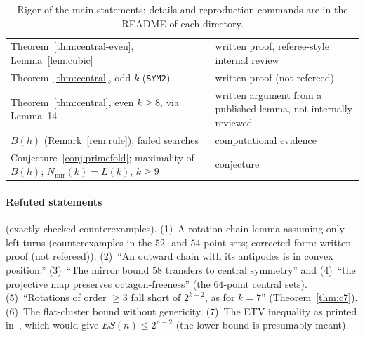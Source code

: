 \documentclass[10pt]{article}
\theoremstyle{definition}
\theoremstyle{remark}
\newcommand{\Nm}{N_{\mathrm{mir}}}
\newcommand{\dirn}[1]{{\upshape\nolinkurl{#1}}}
\begin{document}
\begin{table}[ht]
\begin{tabular}{@{}p{}p{}@{}}
Theorem~\ref{thm:central-even}, Lemma~\ref{lem:cubic} & written proof, referee-style internal review\\
Theorem~\ref{thm:central}, odd $k$ (\dirn{SYM2}) & written proof (not refereed)\\
Theorem~\ref{thm:central}, even $k\ge8$, via Lemma~14 & written argument from a published lemma, not internally reviewed\\
$B(h)$ (Remark~\ref{rem:rule}); failed searches & computational evidence\\
Conjecture~\ref{conj:primefold}; maximality of $B(h)$; $\Nm(k)=L(k)$, $k\ge9$ & conjecture\\
\bottomrule
\end{tabular}
\caption{Rigor of the main statements; details and reproduction commands are in the README of each directory.}
\label{tab:rigor}
\end{table}

\paragraph{Refuted statements} (exactly checked counterexamples). (1)~A rotation-chain lemma assuming only left turns
(counterexamples in the $52$- and $54$-point sets; corrected form: written proof (not refereed)). (2)~``An outward chain
with its antipodes is in convex position.'' (3)~``The mirror bound $58$ transfers to central symmetry'' and (4)~``the
projective map preserves octagon-freeness'' (the $64$-point central sets). (5)~``Rotations of order $\ge3$ fall short of
$2^{k-2}$, as for $k=7$'' (Theorem~\ref{thm:c7}). (6)~The flat-cluster bound without genericity. (7)~The ETV inequality as
printed in~\cite[p.~443]{MS00}, which would give $ES(n)\le2^{n-2}$ (the lower bound is presumably meant).
\end{document}

